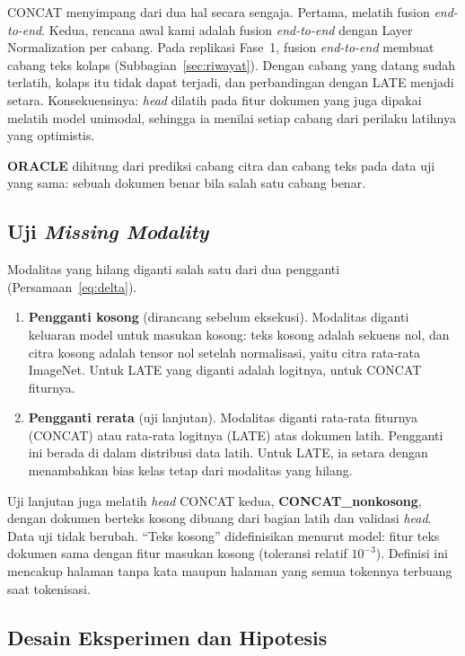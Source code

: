CONCAT menyimpang dari dua hal secara sengaja. Pertama, \textcite{audebert2020} melatih
fusion \textit{end-to-end}. Kedua, rencana awal kami adalah fusion \textit{end-to-end}
dengan Layer Normalization per cabang. Pada replikasi Fase~1, fusion \textit{end-to-end}
membuat cabang teks kolaps (Subbagian~\ref{sec:riwayat}). Dengan cabang yang datang sudah
terlatih, kolaps itu tidak dapat terjadi, dan perbandingan dengan LATE menjadi setara.
Konsekuensinya: \textit{head} dilatih pada fitur dokumen yang juga dipakai melatih model
unimodal, sehingga ia menilai setiap cabang dari perilaku latihnya yang optimistis.

\textbf{ORACLE} dihitung dari prediksi cabang citra dan cabang teks pada data uji yang
sama: sebuah dokumen benar bila salah satu cabang benar.

\subsection{Uji \textit{Missing Modality}}\label{sec:metode-missing}

Modalitas yang hilang diganti salah satu dari dua pengganti (Persamaan~\ref{eq:delta}).

\begin{enumerate}
  \item \textbf{Pengganti kosong} (dirancang sebelum eksekusi). Modalitas diganti keluaran
  model untuk masukan kosong: teks kosong adalah sekuens nol, dan citra kosong adalah
  tensor nol setelah normalisasi, yaitu citra rata-rata ImageNet. Untuk LATE yang diganti
  adalah logitnya, untuk CONCAT fiturnya.
  \item \textbf{Pengganti rerata} (uji lanjutan). Modalitas diganti rata-rata fiturnya
  (CONCAT) atau rata-rata logitnya (LATE) atas dokumen latih. Pengganti ini berada di
  dalam distribusi data latih. Untuk LATE, ia setara dengan menambahkan bias kelas tetap
  dari modalitas yang hilang.
\end{enumerate}

Uji lanjutan juga melatih \textit{head} CONCAT kedua, \textbf{CONCAT\_nonkosong}, dengan
dokumen berteks kosong dibuang dari bagian latih dan validasi \textit{head}. Data uji
tidak berubah. \enquote{Teks kosong} didefinisikan menurut model: fitur teks dokumen sama
dengan fitur masukan kosong (toleransi relatif $10^{-3}$). Definisi ini mencakup halaman
tanpa kata maupun halaman yang semua tokennya terbuang saat tokenisasi.

\subsection{Desain Eksperimen dan Hipotesis}\label{sec:desain}

